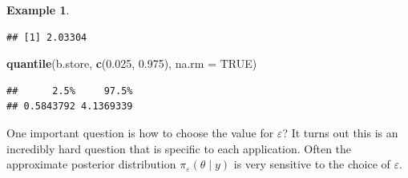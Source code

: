 \documentclass[
]{book}
\newenvironment{Shaded}{\begin{snugshade}}{\end{snugshade}}
\newcommand{\AttributeTok}[1]{\textcolor[rgb]{0.13,0.29,0.53}{#1}}
\newcommand{\ConstantTok}[1]{\textcolor[rgb]{0.56,0.35,0.01}{#1}}
\newcommand{\FloatTok}[1]{\textcolor[rgb]{0.00,0.00,0.81}{#1}}
\newcommand{\FunctionTok}[1]{\textcolor[rgb]{0.13,0.29,0.53}{\textbf{#1}}}
\newcommand{\NormalTok}[1]{#1}
\theoremstyle{definition}
\theoremstyle{definition}
\newtheorem{example}{Example}[chapter]
\theoremstyle{definition}
\theoremstyle{definition}
\theoremstyle{remark}
\begin{document}
\begin{example}
\begin{verbatim}
## [1] 2.03304
\end{verbatim}

\begin{Shaded}
\begin{Highlighting}[]
\FunctionTok{quantile}\NormalTok{(b.store, }\FunctionTok{c}\NormalTok{(}\FloatTok{0.025}\NormalTok{, }\FloatTok{0.975}\NormalTok{), }\AttributeTok{na.rm =} \ConstantTok{TRUE}\NormalTok{)}
\end{Highlighting}
\end{Shaded}

\begin{verbatim}
##      2.5%     97.5% 
## 0.5843792 4.1369339
\end{verbatim}

\end{example}

One important question is how to choose the value for \(\varepsilon\)? It turns out this is an incredibly hard question that is specific to each application. Often the approximate posterior distribution \(\pi_\varepsilon(\theta \mid y)\) is very sensitive to the choice of \(\varepsilon\).
\end{document}

